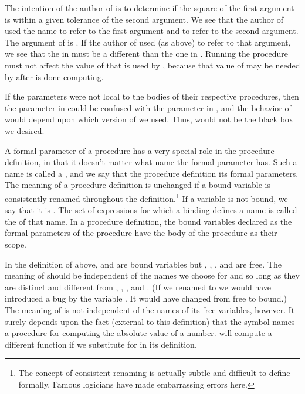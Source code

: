 \noindent
The intention of the author of  is to determine if the
square of the first argument is within a given tolerance of the second
argument.  We see that the author of  used the name
 to refer to the first argument and  to refer to the second
argument.  The argument of  is .  If the author of
 used  (as above) to refer to that argument, we see that
the  in  must be a different  than the one
in .  Running the procedure  must not affect the
value of  that is used by , because that value of
 may be needed by  after  is done
computing.

If the parameters were not local to the bodies of their respective procedures,
then the parameter  in  could be confused with the
parameter  in , and the behavior of
 would depend upon which version of  we used.
Thus,  would not be the black box we desired.

A formal parameter of a procedure has a very special role in the procedure
definition, in that it doesn't matter what name the formal parameter has.  Such
a name is called a , and we say that the procedure
definition  its formal parameters.  The meaning of a procedure
definition is unchanged if a bound variable is consistently renamed throughout
the definition.\footnote{The concept of consistent renaming is actually subtle
and difficult to define formally.  Famous logicians have made embarrassing
errors here.}  If a variable is not bound, we say that it is .
The set of expressions for which a binding defines a name is called the
 of that name.  In a procedure definition, the bound variables
declared as the formal parameters of the procedure have the body of the
procedure as their scope.

In the definition of  above,  and  are
bound variables but \code{<}, \code{-}, , and  are free.
The meaning of  should be independent of the names we choose
for  and  so long as they are distinct and different from
\code{<}, \code{-}, , and .  (If we renamed 
to  we would have introduced a bug by  the
variable .  It would have changed from free to bound.)  The meaning
of  is not independent of the names of its free variables,
however.  It surely depends upon the fact (external to this definition) that
the symbol  names a procedure for computing the absolute value of a
number.   will compute a different function if we substitute
 for  in its definition.

